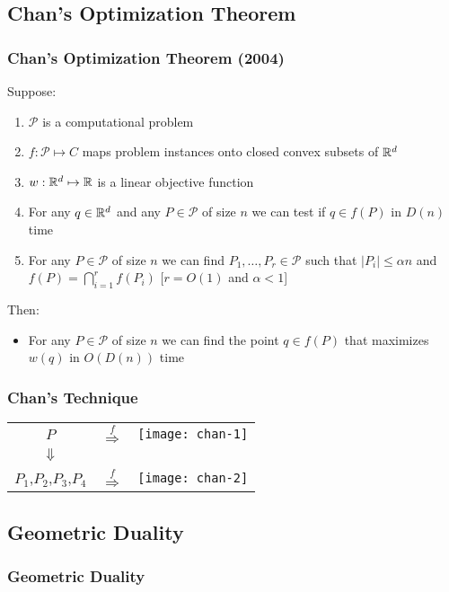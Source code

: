 \documentclass{beamer}
\begin{document}
\subsection{Chan's Optimization Theorem}
\frame
{
  \frametitle{Chan's Optimization Theorem (2004)}
  Suppose:  
  \begin{enumerate}
   \item<1-> $\mathcal{P}$ is a computational problem
   \item<2-> $f:\mathcal{P}\mapsto C$ maps problem instances onto closed 
         convex subsets of $\mathbb{R}^d$
   \item<3-> $w:\mathbb{R}^d\mapsto \mathbb{R}$ is a linear objective function
   \item<5-> For any $q\in\mathbb{R}^d$ and any $P\in\mathcal{P}$ of size $n$ we
         can test if $q\in f(P)$ in $D(n)$ time
   \item<6-> For any $P\in\mathcal{P}$ of size $n$ we can find
         $P_1,\ldots, P_r\in\mathcal{P}$ such that $|P_i|\le\alpha n$ 
         and $f(P)=\bigcap_{i=1}^r f(P_i)$ \hfill{[$r=O(1)$ and $\alpha<1$]}
  \end{enumerate}
  Then:
  \begin{itemize}
    \item<4-> For any $P\in\mathcal{P}$ of size $n$ we can find the point
    $q\in f(P)$ that maximizes $w(q)$ in $O(D(n))$ time
  \end{itemize}
} 

\frame
{
   \frametitle{Chan's Technique}

   \begin{center}
   \begin{tabular}{ccc}
    $P$ & $\stackrel{f}{\Rightarrow}$ & \texttt{[image: chan-1]} \\
    $\Downarrow$ \\
    $P_1$,$P_2$,$P_3$,$P_4$ & $\stackrel{f}{\Rightarrow}$ 
	& \texttt{[image: chan-2]} \\
   \end{tabular}
   \end{center}
}

\subsection{Geometric Duality}
\frame
{ \frametitle{Geometric Duality}
}
\end{document}
